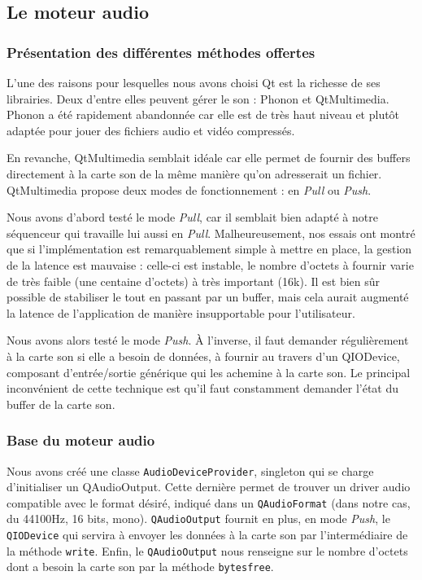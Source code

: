 \subsection{Le moteur audio}

\subsubsection{Présentation des différentes méthodes offertes}

L'une des raisons pour lesquelles nous avons choisi Qt est la
richesse de ses librairies. Deux d'entre elles peuvent gérer le son
: Phonon et QtMultimedia. Phonon a été rapidement abandonnée car
elle est de très haut niveau et plutôt adaptée pour jouer des
fichiers audio et vidéo compressés.

En revanche, QtMultimedia semblait idéale car elle permet de
fournir des buffers directement à la carte son de la même manière
qu'on adresserait un fichier. QtMultimedia propose deux modes de
fonctionnement : en \emph{Pull} ou \emph{Push}.

Nous avons d'abord testé le mode \emph{Pull}, car il semblait bien
adapté à notre séquenceur qui travaille lui aussi en \emph{Pull}.
Malheureusement, nos essais ont montré que si l'implémentation est
remarquablement simple à mettre en place, la gestion de la latence
est mauvaise : celle-ci est instable, le nombre d'octets à fournir
varie de très faible (une centaine d'octets) à très important
(16k). Il est bien sûr possible de stabiliser le tout en passant
par un buffer, mais cela aurait augmenté la latence de
l'application de manière insupportable pour l'utilisateur.

Nous avons alors testé le mode \emph{Push}. À l'inverse, il faut
demander régulièrement à la carte son si elle a besoin de données,
à fournir au travers d'un QIODevice, composant d'entrée/sortie
générique qui les achemine à la carte son. Le principal
inconvénient de cette technique est qu'il faut constamment demander
l'état du buffer de la carte son.

\subsubsection{Base du moteur audio}

Nous avons créé une classe \verb!AudioDeviceProvider!, singleton
qui se charge d'initialiser un QAudioOutput. Cette dernière permet
de trouver un driver audio compatible avec le format désiré,
indiqué dans un \verb!QAudioFormat! (dans notre cas, du 44100Hz, 16
bits, mono). \verb!QAudioOutput! fournit en plus, en mode
\emph{Push}, le \verb!QIODevice! qui servira à envoyer les données
à la carte son par l'intermédiaire de la méthode \verb!write!.
Enfin, le \verb!QAudioOutput! nous renseigne sur le nombre d'octets
dont a besoin la carte son par la méthode \verb!bytesfree!.

